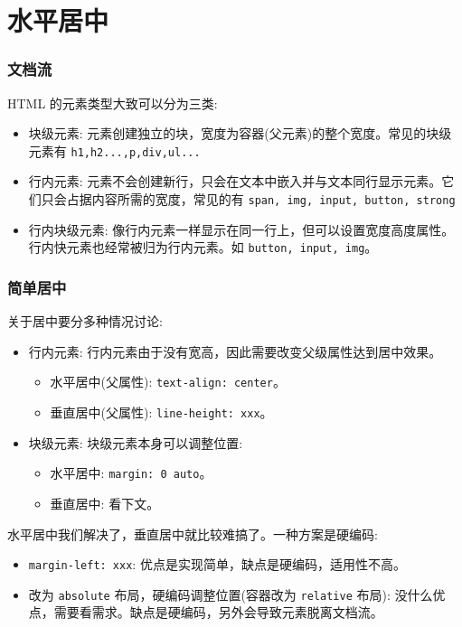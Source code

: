 \section{水平居中}

\subsubsection*{文档流}

HTML 的元素类型大致可以分为三类:
\begin{itemize}
  \item 块级元素: 元素创建独立的块，宽度为容器(父元素)的整个宽度。常见的块级元素有 \texttt{h1,h2...,p,div,ul...}
  \item 行内元素: 元素不会创建新行，只会在文本中嵌入并与文本同行显示元素。它们只会占据内容所需的宽度，常见的有 \texttt{span, img, input, button, strong}
  \item 行内块级元素: 像行内元素一样显示在同一行上，但可以设置宽度高度属性。行内快元素也经常被归为行内元素。如 \texttt{button, input, img}。
\end{itemize}

\subsubsection*{简单居中}

关于居中要分多种情况讨论:
\begin{itemize}
  \item 行内元素: 行内元素由于没有宽高，因此需要改变父级属性达到居中效果。
  \begin{itemize}
    \item 水平居中(父属性): \texttt{text-align: center}。
    \item 垂直居中(父属性): \texttt{line-height: xxx}。
  \end{itemize}
  \item 块级元素: 块级元素本身可以调整位置:
  \begin{itemize}
    \item 水平居中: \texttt{margin: 0 auto}。
    \item 垂直居中: 看下文。
  \end{itemize}
\end{itemize}

水平居中我们解决了，垂直居中就比较难搞了。一种方案是硬编码:
\begin{itemize}
  \item \texttt{margin-left: xxx}: 优点是实现简单，缺点是硬编码，适用性不高。
  \item 改为 \texttt{absolute} 布局，硬编码调整位置(容器改为 \texttt{relative} 布局): 没什么优点，需要看需求。缺点是硬编码，另外会导致元素脱离文档流。
\end{itemize}

